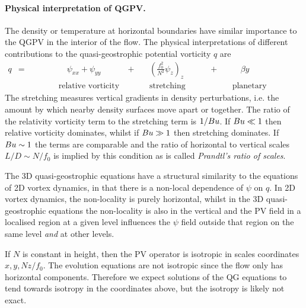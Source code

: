 \documentclass{jknotes}
\begin{document}
\paragraph{Physical interpretation of QGPV.} 
The density or temperature at horizontal boundaries have similar importance to
the QGPV in the interior of the flow. The physical interpretations of different
contributions to the quasi-geostrophic potential vorticity $q$ are
\begin{align}
	q \,\,\,= \hspace{3em}&\hspace{1em}\psi_{xx} + \psi_{yy} \hspace{3em}+ &&\left( \frac{f_0^2}{N^2} \psi_z
	\right)_z \hspace{3em}+ && \hspace{1em}\beta y \\
	&\text{relative vorticity} && \text{stretching} && \text{planetary
vorticity}	
\end{align}
The stretching measures vertical gradients in density perturbations, i.e. the
amount by which nearby density surfaces move apart or together. The ratio of
the relativity vorticity term to the stretching term is $1/Bu$. If $Bu \ll
1$ then relative vorticity dominates, whilst if $Bu \gg 1$ then stretching
dominates. If $Bu \sim 1$ the terms are comparable and the ratio of
horizontal to vertical scales $L/D \sim N /f_0$ is implied by this condition
as is called \emph{Prandtl's ratio of scales}.

The 3D quasi-geostrophic equations have a structural similarity to the
equations of 2D vortex dynamics, in that there is a non-local dependence of
$\psi$ on $q$. In 2D vortex dynamics, the non-locality is purely horizontal,
whilst in the 3D quasi-geostrophic equations the non-locality is also in the
vertical and the PV field in a localised region at a given level influences
the $\psi$ field outside that region on the same level \emph{and} at other
levels.

If $N$ is constant in height, then the PV operator is isotropic in scales
coordinates $x, y, Nz/f_0$. The evolution equations are not isotropic since
the flow only has horizontal components. Therefore we expect solutions of the
QG equations to tend towards isotropy in the coordinates above, but the
isotropy is likely not exact.

\end{document}
